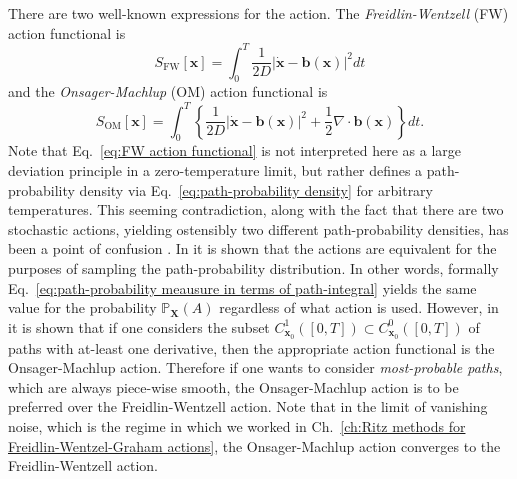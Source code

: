 There are two well-known expressions for the action. The \textit{Freidlin-Wentzell} (FW) action functional is \citep{adibStochasticActionsDiffusive2008a, wentzellSmallRandomPerturbations1970, touchetteLargeDeviationApproach2009, grafke_numerical_2019}
\begin{equation} \label{eq:FW action functional}
S_\text{FW}[\mathbf{x}] = \int_0^T \frac{1}{2 D} |\dot{\mathbf{x}} - \mathbf{b}(\mathbf{x})|^2 dt
\end{equation}
and the \textit{Onsager-Machlup} (OM) action functional is \citep{adibStochasticActionsDiffusive2008a, durrOnsagerMachlupFunctionLagrangian1978, stratonovichProbabilityFunctionalDiffusion1971, fujitaOnsagerMachlupFunctionDiffusion1982a, onsagerFluctuationsIrreversibleProcesses1953a, bachFunctionalsPathsDiffusion1977a, horsthemkeOnsagerMachlupFunctionOne1975}
\begin{equation} \label{eq:OM action functional}
S_\text{OM}[\mathbf{x}] = \int_0^T \left\{ \frac{1}{2 D} |\dot{\mathbf{x}} - \mathbf{b}(\mathbf{x})|^2 + \frac{1}{2} \nabla \cdot \mathbf{b}(\mathbf{x}) \right\} dt.
\end{equation}
Note that Eq.~\ref{eq:FW action functional} is not interpreted here as a large deviation principle in a zero-temperature limit, but rather defines a path-probability density via Eq.~\ref{eq:path-probability density} for arbitrary temperatures. This seeming contradiction, along with the fact that there are two stochastic actions, yielding ostensibly two different path-probability densities, has been a point of confusion \citep{adibStochasticActionsDiffusive2008a, gladrowExperimentalMeasurementRelative2021a}.  In \citep{adibStochasticActionsDiffusive2008a} it is shown that the actions are equivalent for the purposes of sampling the path-probability distribution. In other words, formally Eq.~\ref{eq:path-probability meausure in terms of path-integral} yields the same value for the probability $\mathbb{P}_\mathbf{X}(A)$ regardless of what action is used. However, in \citep{gladrowExperimentalMeasurementRelative2021a} it is shown that if one considers the subset $C^1_{\mathbf{x}_0}([0,T]) \subset C^0_{\mathbf{x}_0}([0,T])$ of paths with at-least one derivative, then the appropriate action functional is the Onsager-Machlup action. Therefore if one wants to consider \textit{most-probable paths}, which are always piece-wise smooth, the Onsager-Machlup action is to be preferred over the Freidlin-Wentzell action. Note that in the limit of vanishing noise, which is the regime in which we worked in Ch.~\ref{ch:Ritz methods for Freidlin-Wentzel-Graham actions}, the Onsager-Machlup action converges to the Freidlin-Wentzell action. 
 
